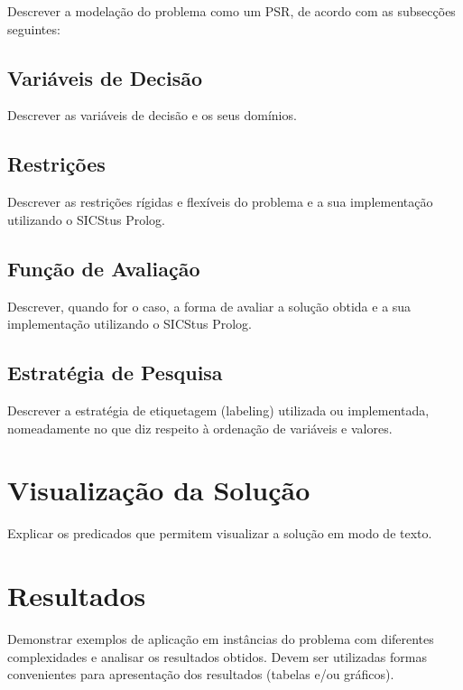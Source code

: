 \documentclass[a4paper]{article}
\begin{document}
 Descrever a modelação do problema como um PSR, de acordo com as subsecções seguintes:

\subsection{Variáveis de Decisão}

Descrever as variáveis de decisão e os seus domínios.

\subsection{Restrições}

Descrever as restrições rígidas e flexíveis do problema e a sua implementação utilizando o SICStus Prolog.

\subsection{Função de Avaliação}

Descrever, quando for o caso, a forma de avaliar a solução obtida e a sua implementação utilizando o SICStus Prolog.

\subsection{Estratégia de Pesquisa}

Descrever a estratégia de etiquetagem (labeling) utilizada ou implementada, nomeadamente no que diz respeito à ordenação de variáveis e valores.

\newpage


\section{Visualização da Solução}

Explicar os predicados que permitem visualizar a solução em modo de texto.

\newpage

\section{Resultados}

Demonstrar exemplos de aplicação em instâncias do problema com diferentes complexidades e analisar os resultados obtidos. Devem ser utilizadas formas convenientes para apresentação dos resultados (tabelas e/ou gráficos).
\end{document}
